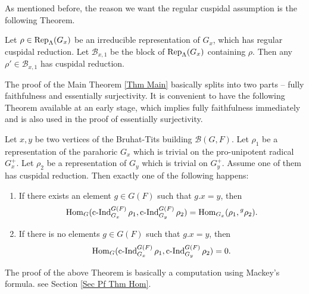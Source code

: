 	As mentioned before, the reason we want the regular cuspidal assumption is the following Theorem. 
	
	\begin{theorem}\label{Thm Cusp Red}
		Let $\rho \in \operatorname{\operatorname{Rep}}_{\Lambda}(G_x)$ be an irreducible representation of $G_x$, which has regular cuspidal reduction. Let $\mathcal{B}_{x,1}$ be the block of $\operatorname{\operatorname{Rep}}_{\Lambda}(G_x)$ containing $\rho$. Then any $\rho' \in \mathcal{B}_{x,1}$ has cuspidal reduction.
	\end{theorem}
	
	The proof of the Main Theorem \ref{Thm Main} basically splits into two parts -- fully faithfulness and essentially surjectivity. It is convenient to have the following Theorem available at an early stage, which implies fully faithfulness immediately and is also used in the proof of essentially surjectivity.
	
	\begin{theorem}\label{Thm Hom}
		Let $x, y$ be two vertices of the Bruhat-Tits building $\mathcal{B}(G, F)$. Let $\rho_1$ be a representation of the parahoric $G_x$ which is trivial on the pro-unipotent radical $G_x^+$. Let $\rho_2$ be a representation of $G_y$ which is trivial on $G_y^+$. Assume one of them has cuspidal reduction. Then exactly one of the following happens:
		\begin{enumerate}
			\item If there exists an element $g \in G(F)$ such that $g.x=y$, then
			$$\operatorname{\operatorname{Hom}}_G(\operatorname{\operatorname{c-Ind}}_{G_x}^{G(F)}\rho_1, \operatorname{\operatorname{c-Ind}}_{G_y}^{G(F)}\rho_2)=\operatorname{\operatorname{Hom}}_{G_x}(\rho_1, {^g\rho_2}).$$
			\item If there is no elements $g \in G(F)$ such that $g.x=y$, then
			$$\operatorname{\operatorname{Hom}}_G(\operatorname{\operatorname{c-Ind}}_{G_x}^{G(F)}\rho_1, \operatorname{\operatorname{c-Ind}}_{G_y}^{G(F)}\rho_2)=0.$$
		\end{enumerate}
	\end{theorem}
	
	The proof of the above Theorem is basically a computation using Mackey's formula. see Section \ref{Sec Pf Thm Hom}.
	
